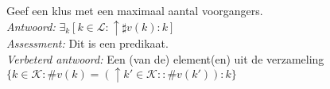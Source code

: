 
\item Geef een klus met een maximaal aantal voorgangers. \\


\emph{Antwoord:} $\exists_{k}[ k \in \mathcal{L} : \uparrow \sharp v(k) : k ]$ \\
\emph{Assessment:} Dit is een predikaat. \\

\emph{Verbeterd antwoord:} Een (van de) element(en) uit de verzameling $ \{ k \in \mathcal{K} : \# v(k) = ( \uparrow k' \in \mathcal{K} : : \# v(k') ) : k \}$ \\

